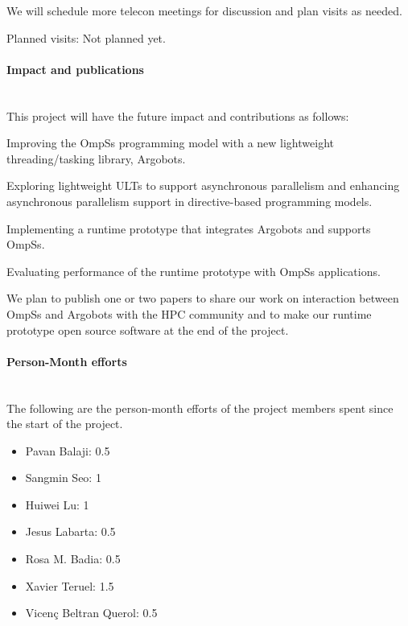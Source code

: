 \begin{refsection}
We will schedule more telecon meetings for discussion and plan visits as needed.

Planned visits: Not planned yet.


\paragraph{Impact and publications}~\\

This project will have the future impact and contributions as follows:
\begin{itemize*}
  \item Improving the OmpSs programming model with a new lightweight
        threading/tasking library, Argobots.
  \item Exploring lightweight ULTs to support asynchronous parallelism and
        enhancing asynchronous parallelism support in directive-based
        programming models.
  \item Implementing a runtime prototype that integrates Argobots and supports
        OmpSs.
  \item Evaluating performance of the runtime prototype with OmpSs applications.
\end{itemize*}

We plan to publish one or two papers to share our work on interaction between
OmpSs and Argobots with the HPC community and to make our runtime prototype open
source software at the end of the project.


\paragraph{Person-Month efforts}~\\

The following are the person-month efforts of the project members spent since
the start of the project.
\begin{itemize}
  \item Pavan Balaji: 0.5
  \item Sangmin Seo: 1
  \item Huiwei Lu: 1
  \item Jesus Labarta: 0.5
  \item Rosa M. Badia: 0.5
  \item Xavier Teruel: 1.5
  \item Vicenç Beltran Querol: 0.5
\end{itemize}



\end{refsection}

